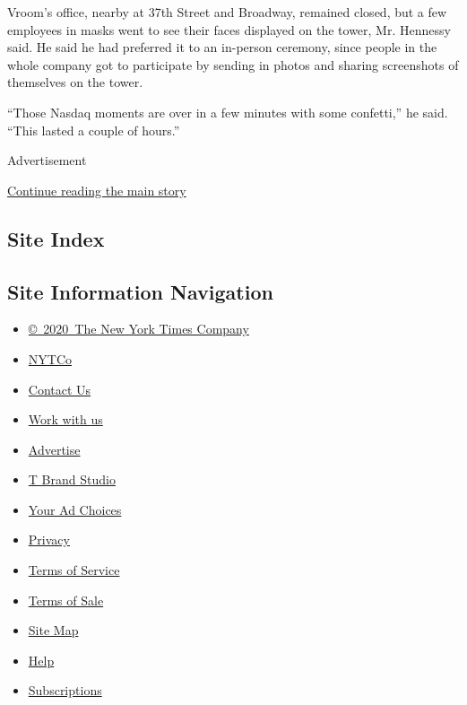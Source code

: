 Vroom's office, nearby at 37th Street and Broadway, remained closed, but
a few employees in masks went to see their faces displayed on the tower,
Mr. Hennessy said. He said he had preferred it to an in-person ceremony,
since people in the whole company got to participate by sending in
photos and sharing screenshots of themselves on the tower.

``Those Nasdaq moments are over in a few minutes with some confetti,''
he said. ``This lasted a couple of hours.''

Advertisement

\protect\hyperlink{after-bottom}{Continue reading the main story}

\hypertarget{site-index}{%
\subsection{Site Index}\label{site-index}}

\hypertarget{site-information-navigation}{%
\subsection{Site Information
Navigation}\label{site-information-navigation}}

\begin{itemize}
\tightlist
\item
  \href{https://help.nytimes3xbfgragh.onion/hc/en-us/articles/115014792127-Copyright-notice}{©~2020~The
  New York Times Company}
\end{itemize}

\begin{itemize}
\tightlist
\item
  \href{https://www.nytco.com/}{NYTCo}
\item
  \href{https://help.nytimes3xbfgragh.onion/hc/en-us/articles/115015385887-Contact-Us}{Contact
  Us}
\item
  \href{https://www.nytco.com/careers/}{Work with us}
\item
  \href{https://nytmediakit.com/}{Advertise}
\item
  \href{http://www.tbrandstudio.com/}{T Brand Studio}
\item
  \href{https://www.nytimes3xbfgragh.onion/privacy/cookie-policy\#how-do-i-manage-trackers}{Your
  Ad Choices}
\item
  \href{https://www.nytimes3xbfgragh.onion/privacy}{Privacy}
\item
  \href{https://help.nytimes3xbfgragh.onion/hc/en-us/articles/115014893428-Terms-of-service}{Terms
  of Service}
\item
  \href{https://help.nytimes3xbfgragh.onion/hc/en-us/articles/115014893968-Terms-of-sale}{Terms
  of Sale}
\item
  \href{https://spiderbites.nytimes3xbfgragh.onion}{Site Map}
\item
  \href{https://help.nytimes3xbfgragh.onion/hc/en-us}{Help}
\item
  \href{https://www.nytimes3xbfgragh.onion/subscription?campaignId=37WXW}{Subscriptions}
\end{itemize}
